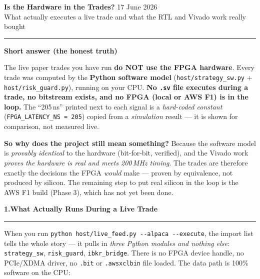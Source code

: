 \documentclass[10pt,a4paper]{article}
\newcommand{\sectionrule}{\par\nobreak\vspace{1pt}\textcolor{rulegray}{\rule{\linewidth}{0.8pt}}\par\vspace{1pt}}
\newcommand{\fpath}[1]{\texttt{\textcolor{hdrblue}{#1}}}
\begin{document}
{\LARGE\bfseries\color{hdrblue} Is the Hardware in the Trades?}%
\hfill{\small\color{rulegray} 17 June 2026}\\[-2pt]
{\large\color{accentteal} What actually executes a live trade \textendash{} and what the RTL and Vivado work really bought}

\textcolor{hdrblue}{\rule{\linewidth}{2pt}}

\begin{warnboxx}
{\large\bfseries\color{badred} Short answer (the honest truth)}

\smallskip
The live paper trades you have run \textbf{do NOT use the FPGA hardware}. Every
trade was computed by the \textbf{Python software model}
(\fpath{host/strategy\_sw.py} + \fpath{host/risk\_guard.py}), running on your
CPU. \textbf{No \texttt{.sv} file executes during a trade, no bitstream exists,
and no FPGA (local or AWS F1) is in the loop.} The ``205\,ns'' printed next to
each signal is a \emph{hard-coded constant} (\fpath{FPGA\_LATENCY\_NS = 205})
copied from a \emph{simulation} result --- it is shown for comparison, not
measured live.

\smallskip
\textbf{So why does the project still mean something?} Because the software model
is \emph{provably identical} to the hardware (bit-for-bit, verified), and the
Vivado work \emph{proves the hardware is real and meets 200\,MHz timing}. The
trades are therefore exactly the decisions the FPGA \emph{would} make --- proven
by equivalence, not produced by silicon. The remaining step to put real silicon
in the loop is the AWS F1 build (Phase 3), which has not yet been done.
\end{warnboxx}

{\large\bfseries\color{hdrblue} 1.\quad What Actually Runs During a Live Trade}
\sectionrule

When you run \fpath{python host/live\_feed.py -{}-alpaca -{}-execute}, the import
list tells the whole story --- it pulls in \emph{three Python modules and
nothing else}: \fpath{strategy\_sw}, \fpath{risk\_guard}, \fpath{ibkr\_bridge}.
There is no FPGA device handle, no PCIe/XDMA driver, no \texttt{.bit} or
\texttt{.awsxclbin} file loaded. The data path is 100\% software on the CPU:
\end{document}
